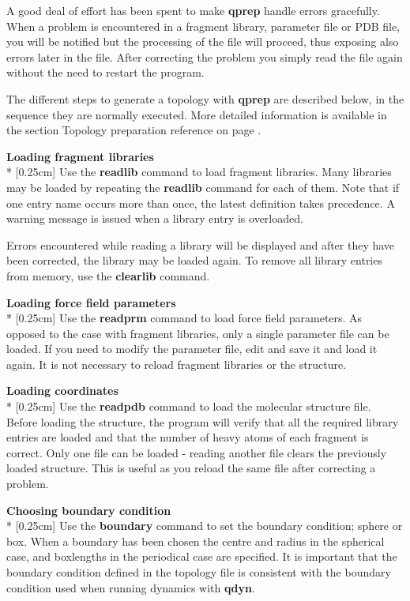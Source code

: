 \documentclass[a4paper,10pt]{article}
\begin{document}
A good  deal of effort  has been  spent to make  \textbf{qprep} handle
errors  gracefully.  When  a  problem is  encountered  in  a  fragment
library, parameter  file or  PDB file,  you will  be notified  but the
processing of the  file will proceed, thus exposing  also errors later
in the  file. After correcting  the problem  you simply read  the file
again without the need to restart the program.

The different  steps to  generate a  topology with  \textbf{qprep} are
described  below, in  the sequence  they are  normally executed.  More
detailed information is available  in the section Topology preparation
reference on page \pageref{subsec:top_prep_ref}.

\textbf{Loading fragment libraries}\\*
[0.25cm] Use the \textbf{readlib}  command to load fragment libraries.
Many libraries may be loaded by repeating the \textbf{readlib} command
for each of them.  Note that if one entry name  occurs more than once,
the latest  definition takes precedence.  A warning message  is issued
when a library entry is overloaded.

Errors encountered while reading a library will be displayed and after
they have been corrected, the library  may be loaded again.  To remove
all library entries from memory, use the \textbf{clearlib} command.

\textbf{Loading force field parameters}\\*
[0.25cm]  Use  the  \textbf{readprm  } command  to  load  force  field
parameters. As  opposed to  the case with  fragment libraries,  only a
single  parameter file  can  be  loaded. If  you  need  to modify  the
parameter  file,  edit and  save  it  and load  it  again.  It is  not
necessary to reload fragment libraries or the structure.

\textbf{Loading coordinates}\\*
[0.25cm]  Use  the  \textbf{readpdb}  command to  load  the  molecular
structure file.  Before loading the structure, the program will verify
that all the  required library entries are loaded and  that the number
of  heavy atoms  of each  fragment is  correct. Only  one file  can be
loaded   -  reading   another  file   clears  the   previously  loaded
structure. This is useful as you reload the same file after correcting
a problem.

\textbf{Choosing boundary condition}\\*
[0.25cm]  Use  the  \textbf{boundary}  command  to  set  the  boundary
condition; sphere or  box. When a boundary has been  chosen the centre
and radius  in the  spherical case, and  boxlengths in  the periodical
case  are  specified. It  is  important  that the  boundary  condition
defined in the topology file is consistent with the boundary condition
used when running dynamics with \textbf{qdyn}.
\end{document}
